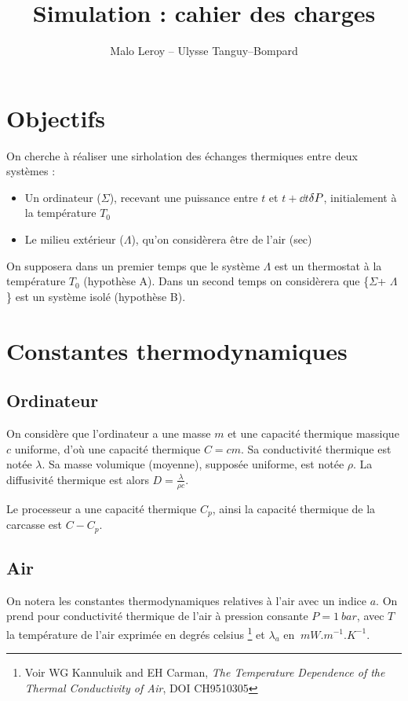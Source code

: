 \documentclass{article}
\title{Simulation : cahier des charges}
\author{Malo Leroy -- Ulysse Tanguy--Bompard}
\newcommand{\air}{$\Lambda$\xspace}
\newcommand{\ordi}{$\Sigma$\xspace}
\newcommand{\etdt}{entre $t$ et $t + \dd t$\xspace}
\begin{document}
\maketitle

\section{Objectifs}

On cherche à réaliser une sirholation des échanges thermiques entre deux systèmes :
\begin{itemize}
    \item Un ordinateur (\ordi), recevant  une puissance \etdt $\var{P}$, initialement à la température $T_0$
    \item Le milieu extérieur (\air), qu'on considèrera être de l'air (sec)
\end{itemize}

On supposera dans un premier temps que le système \air est un thermostat à la température $T_0$ (hypothèse A). Dans un second temps on considèrera que \{\ordi + $\Lambda$\} est un système isolé (hypothèse B).

\section{Constantes thermodynamiques}

\subsection{Ordinateur}

On considère que l'ordinateur a une masse $m$ et une capacité thermique massique $c$ uniforme, d'où une capacité thermique $C = c m$. Sa conductivité thermique est notée $\lambda$. Sa masse volumique (moyenne), supposée uniforme, est notée $\rho$. La diffusivité thermique est alors $D = \frac{\lambda} {\rho c}$.

Le processeur a une capacité thermique $C_p$, ainsi la capacité thermique de la carcasse est $C - C_p$.

\subsection{Air}

On notera les constantes thermodynamiques relatives à l'air avec un indice $a$. On prend pour conductivité thermique de l'air à pression consante $P = \SI{1}{bar}$, avec $T$ la température de l'air exprimée en degrés celsius \footnote{Voir  WG Kannuluik and EH Carman, \textit{The Temperature Dependence of the Thermal Conductivity of Air}, DOI CH9510305} et $\lambda_{a}$ en $\SI{}{mW.m^{-1}.K^{-1}}$.
\end{document}
